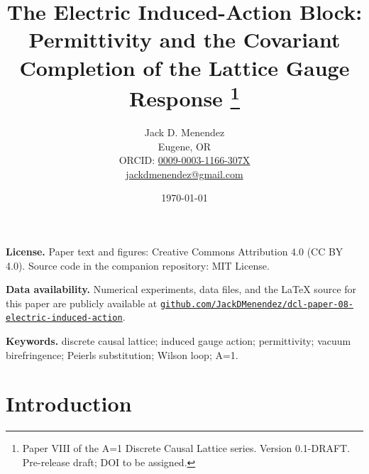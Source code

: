 \documentclass[12pt, letterpaper]{article}
\title{The Electric Induced-Action Block:\\
       Permittivity and the Covariant Completion of the Lattice Gauge Response%
       \thanks{Paper VIII of the A=1 Discrete Causal Lattice series.
       Version 0.1-DRAFT.
       Pre-release draft; DOI to be assigned.}}
\author{Jack D. Menendez\\
        \small Eugene, OR\\
        \small ORCID: \href{https://orcid.org/0009-0003-1166-307X}{0009-0003-1166-307X}\\
        \small \href{mailto:jackdmenendez@gmail.com}{jackdmenendez@gmail.com}}
\date{\today}
\begin{document}
\maketitle

\noindent\textbf{License.}  Paper text and figures: Creative Commons
Attribution 4.0 (CC BY 4.0).  Source code in the companion
repository: MIT License.

\medskip
\noindent\textbf{Data availability.}  Numerical experiments, data
files, and the LaTeX source for this paper are publicly available at
\href{https://github.com/JackDMenendez/dcl-paper-08-electric-induced-action}%
     {\nolinkurl{github.com/JackDMenendez/dcl-paper-08-electric-induced-action}}.

\medskip
\noindent\textbf{Keywords.}  discrete causal lattice; induced gauge action;
permittivity; vacuum birefringence; Peierls substitution; Wilson loop; A=1.

\newpage

\begin{abstract}
    
\end{abstract}



\newpage
\tableofcontents
\newpage

\section{Introduction}

\end{document}
